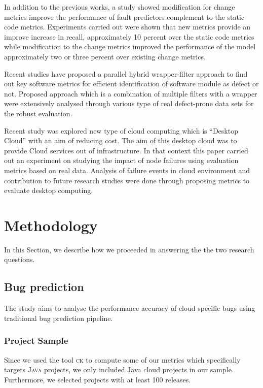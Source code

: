 \documentclass{seal_article}
\begin{document}
In addition to the previous works, a study showed modification for change metrics improve the performance of fault predictors complement to the static code metrics. Experiments carried out were shown that new metrics  provide an improve increase in recall, approximately 10 percent over the static code metrics  while modification to the change metrics improved the performance of the model approximately two or three percent over existing change metrics.\cite{choudhary}

Recent studies have proposed a parallel hybrid wrapper-filter approach to find out key software metrics for efficient identification of software module as defect or not. Proposed approach which is a combination of multiple filters with a wrapper were extensively analysed through various type of real defect-prone data sets for the robust evaluation.
\cite{ali}

Recent study was explored new type of cloud computing which is “Desktop Cloud” with an aim of reducing cost. The aim of this desktop cloud was to provide Cloud services out of infrastructure. In that context this paper carried out an experiment on studying the impact of node failures using evaluation metrics based on real data. Analysis of failure events in cloud environment and contribution to future research studies were done through proposing metrics to evaluate desktop computing. \cite{alw}






\section{Methodology}

In this Section, we describe how we proceeded in answering the the two research questions.

\subsection{Bug prediction}
The study aims to analyse the performance accuracy of cloud specific bugs using traditional bug prediction pipeline. 

\subsubsection{Project Sample}
Since we used the tool \textsc{ck} \cite{ck} to compute some of our metrics which specifically targets \textsc{Java} projects, we only included Java cloud projects in our sample. Furthermore, we selected projects with at least 100 releases.
\end{document}
